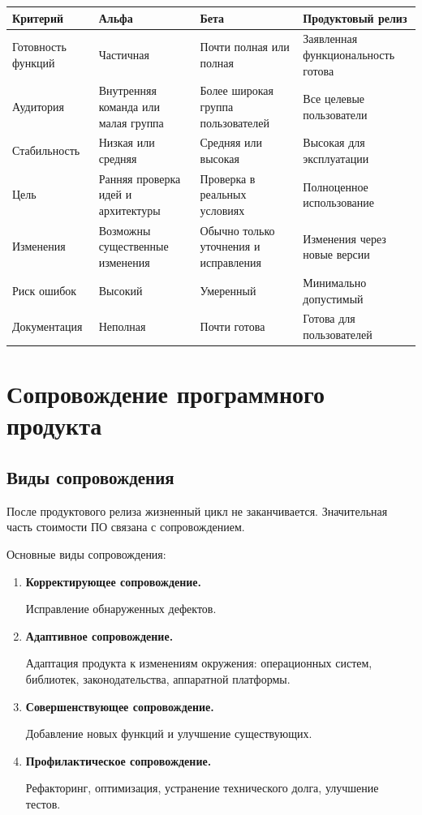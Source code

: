 \documentclass[12pt,a4paper]{article}
\begin{document}
\begin{center}
\begin{tabular}{p{} p{} p{} p{}}
\toprule
\textbf{Критерий} & \textbf{Альфа} & \textbf{Бета} & \textbf{Продуктовый релиз} \\
\midrule
Готовность функций & Частичная & Почти полная или полная & Заявленная функциональность готова \\
Аудитория & Внутренняя команда или малая группа & Более широкая группа пользователей & Все целевые пользователи \\
Стабильность & Низкая или средняя & Средняя или высокая & Высокая для эксплуатации \\
Цель & Ранняя проверка идей и архитектуры & Проверка в реальных условиях & Полноценное использование \\
Изменения & Возможны существенные изменения & Обычно только уточнения и исправления & Изменения через новые версии \\
Риск ошибок & Высокий & Умеренный & Минимально допустимый \\
Документация & Неполная & Почти готова & Готова для пользователей \\
\bottomrule
\end{tabular}
\end{center}

\section{Сопровождение программного продукта}

\subsection{Виды сопровождения}

После продуктового релиза жизненный цикл не заканчивается. Значительная часть стоимости ПО связана с сопровождением.

Основные виды сопровождения:
\begin{enumerate}
    \item \textbf{Корректирующее сопровождение.}

    Исправление обнаруженных дефектов.

    \item \textbf{Адаптивное сопровождение.}

    Адаптация продукта к изменениям окружения: операционных систем, библиотек, законодательства, аппаратной платформы.

    \item \textbf{Совершенствующее сопровождение.}

    Добавление новых функций и улучшение существующих.

    \item \textbf{Профилактическое сопровождение.}

    Рефакторинг, оптимизация, устранение технического долга, улучшение тестов.
\end{enumerate}
\end{document}
